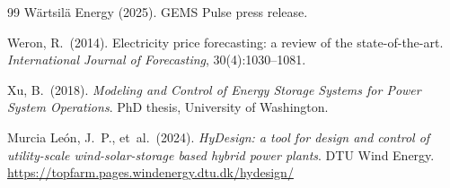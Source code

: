 \documentclass[11pt]{article}
\begin{document}
\begin{thebibliography}{99}
W\"{a}rtsil\"{a} Energy (2025). GEMS Pulse press release.

Weron, R.\ (2014). Electricity price forecasting: a review of the state-of-the-art. \emph{International Journal of Forecasting}, 30(4):1030--1081.

Xu, B.\ (2018). \emph{Modeling and Control of Energy Storage Systems for Power System Operations}. PhD thesis, University of Washington.

Murcia Le\'on, J.~P., et~al.\ (2024). \emph{HyDesign: a tool for design and control of utility-scale wind-solar-storage based hybrid power plants}. DTU Wind Energy. \url{https://topfarm.pages.windenergy.dtu.dk/hydesign/}

\end{thebibliography}
\end{document}

